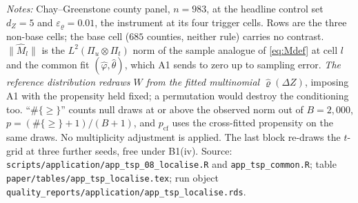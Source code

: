 \documentclass[
  12pt]{article}
\newcommand{\1}[1]{\mathds{1}\left[#1\right]}
\theoremstyle{plain}
\theoremstyle{definition}
\theoremstyle{definition}
\theoremstyle{remark}
\begin{document}
%
%
\begin{table}[!htbp]
\centering
\begin{threeparttable}
\caption{The localisation diagnostic, cell by cell}
\label{tab:app-localise}
\footnotesize

\begin{tablenotes}\footnotesize
\item \textit{Notes:} Chay--Greenstone county panel, $n=983$, at the headline
control set $d_Z=5$ and $\varepsilon_\varrho=0.01$, the instrument at its four
trigger cells. Rows are the three non-base cells; the base cell ($685$ counties,
neither rule) carries no contrast. $\|\hat M_l\|$ is the
$L^{2}(\Pi_u\otimes\Pi_t)$ norm of the sample analogue of \eqref{eq:Mdef} at
cell $l$ and the common fit $(\hat\varphi,\hat\theta)$, which A1 sends to zero
up to sampling error. \emph{The reference distribution redraws $W$ from the
fitted multinomial $\hat\varrho(\Delta Z)$}, imposing A1 with the propensity
held fixed; a permutation would destroy the conditioning too. ``$\#\{\ge\}$''
counts null draws at or above the observed norm out of $B=2{,}000$,
$p=(\#\{\ge\}+1)/(B+1)$, and $p_{\mathrm{cf}}$ uses the cross-fitted propensity
on the same draws. No multiplicity adjustment is applied. The last block
re-draws the $t$-grid at three further seeds, free under B1(iv). Source:
\texttt{scripts/application/app\_tsp\_08\_localise.R} and
\texttt{app\_tsp\_common.R}; table
\texttt{paper/tables/app\_tsp\_localise.tex}; run object
\texttt{quality\_reports/application/app\_tsp\_localise.rds}.
\end{tablenotes}
\end{threeparttable}
\end{table}
\end{document}
